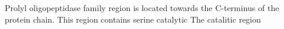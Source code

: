 Prolyl oligopeptidase family region is located towards the C-terminus of the protein chain. This region contains serine catalytic The catalitic region 